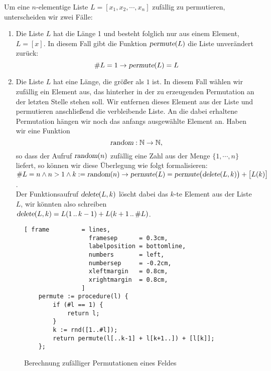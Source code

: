 Um eine $n$-elementige Liste $L = [x_1,x_2, \cdots, x_n]$ zuf\"allig zu permutieren,
unterscheiden wir zwei F\"alle:
\begin{enumerate}
\item Die Liste $L$ hat die L\"ange 1 und besteht folglich nur aus einem Element, $L = [x]$.
      In diesem Fall gibt die Funktion $\textsl{permute}(L)$ die Liste unver\"andert zur\"uck:
      \[ \#L = 1 \rightarrow \textsl{permute}(L) = L \]
\item Die Liste $L$ hat eine L\"ange, die gr\"o{\ss}er als $1$ ist.  In diesem Fall w\"ahlen wir
      zuf\"allig ein Element aus, das hinterher  in der zu erzeugenden Permutation an der letzten Stelle
      stehen soll.  Wir entfernen dieses Element aus der Liste und permutieren
      anschlie{\ss}end die verbleibende Liste.  An die dabei erhaltene Permutation h\"angen wir
      noch das anfangs ausgew\"ahlte Element an.  Haben wir eine Funktion
      \[ \textsl{random}: \mathbb{N} \rightarrow \mathbb{N}, \]
      so dass der Aufruf $\textsl{random}(n)$ zuf\"allig eine Zahl aus der Menge $\{1,\cdots,n\}$
      liefert, so k\"onnen wir diese \"Uberlegung wie folgt formalisieren:
      \\[0.2cm]
      \hspace*{-0.8cm}
      $\#L = n \wedge n > 1 \wedge k :=\textsl{random}(n)  \rightarrow 
         \textsl{permute}(L) = \textsl{permute}\bigl(\textsl{delete}(L,k)\bigr) + \bigl[ L(k)
         \bigr]
      $.
\\[0.2cm]
      Der  Funktionsaufruf $\textsl{delete}(L,k)$ l\"oscht dabei das $k$-te Element aus der Liste $L$,
      wir k\"onnten also schreiben
      \\[0.2cm]
      \hspace*{1.3cm}
      $\textsl{delete}(L,k) = L(1\,..\,k-1) + L(k+1\,..\,\#L)$.
\end{enumerate}

\begin{figure}[!ht]
\centering
\begin{Verbatim}[ frame         = lines, 
                  framesep      = 0.3cm, 
                  labelposition = bottomline,
                  numbers       = left,
                  numbersep     = -0.2cm,
                  xleftmargin   = 0.8cm,
                  xrightmargin  = 0.8cm,
                ]
    permute := procedure(l) {
        if (#l == 1) {
            return l;
        }
        k := rnd([1..#l]);
        return permute(l[..k-1] + l[k+1..]) + [l[k]];
    };
\end{Verbatim}
\vspace*{-0.3cm}
\caption{Berechnung zuf\"alliger Permutationen eines Feldes}
\label{fig:permutation.stlx}
\end{figure}

